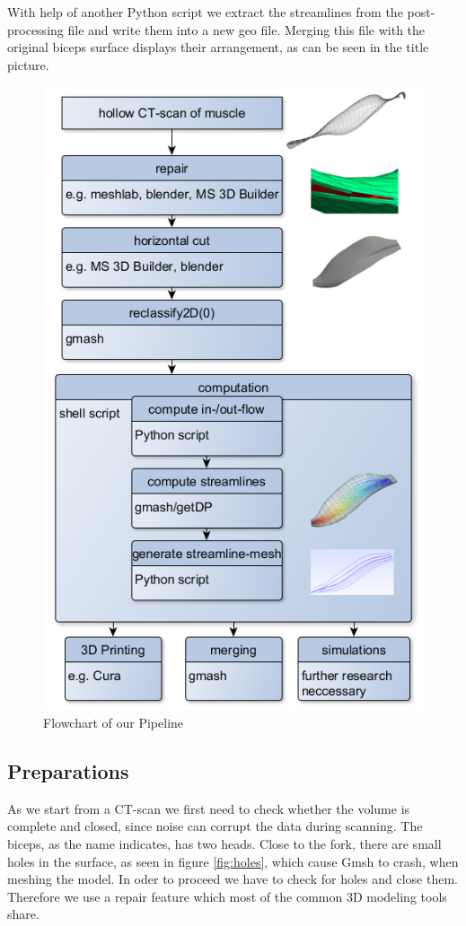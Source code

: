 \documentclass[preprint,journal]{vgtc}       %
\begin{document}
With help of another Python script we extract the streamlines from the post-processing file and write them into a new geo file. 
Merging this file with the original biceps surface displays their arrangement, as can be seen in the title picture.
\begin{figure} 
	\begin{center}
		\includegraphics[width=0.79\linewidth]{flow006.png}
	\end{center}
	\caption{Flowchart of our Pipeline}
	\label{fig:flow}
	
\end{figure}
\subsection{Preparations}
As we start from a CT-scan we first need to check whether the volume is complete and closed, since noise can corrupt the data during scanning.
The biceps, as the name indicates, has two heads. 
Close to the fork, there are small holes in the surface, as seen  in figure \ref{fig:holes}, which cause Gmsh to crash, when meshing the model. 
In oder to proceed we have to check for holes and close them.
Therefore we use a repair feature which most of the common 3D modeling tools share. 
\end{document}
